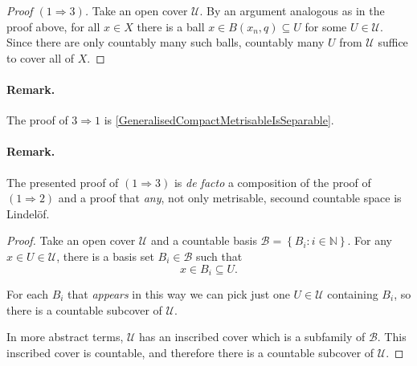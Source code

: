 \begin{proof}[Proof \( (1 \Rightarrow 3) \)]
    Take an open cover \( \mathcal{U} \). By an argument analogous as in the proof above, for all \( x \in X \) there is a ball \(x \in B(x_n, q) \subseteq U \) for some \( U \in \mathcal{U} \). Since there are only countably many such balls, countably many \( U \) from \( \mathcal{U} \) suffice to cover all of \( X \).
\end{proof}

\paragraph{Remark.} The proof of \( 3 \Rightarrow 1 \) is \ref{GeneralisedCompactMetrisableIsSeparable}. 

\paragraph{Remark.} The presented proof of \( (1 \Rightarrow 3) \) is \emph{de facto} a composition of the proof of \( (1 \Rightarrow 2) \) and a proof that \emph{any}, not only metrisable, secound countable space is Lindel\"of.


\begin{proof}
Take an open cover \( \mathcal{U} \) and a countable basis \( \mathcal{B} = \left\{ B_i : i \in \mathbb{N} \right\} \). For any \( x \in U \in \mathcal{U} \), there is a basis set \( B_i \in \mathcal{B}\) such that
\[ 
    x \in B_i \subseteq U.
\]

For each \( B_i \) that \emph{appears} in this way we can pick just one \( U \in \mathcal{U} \) containing \( B_i \), so there is a countable subcover of \( \mathcal{U} \).

In more abstract terms, \( \mathcal{U} \) has an inscribed cover which is a subfamily of \( \mathcal{B} \). This inscribed cover is countable, and therefore there is a countable subcover of \( \mathcal{U} \).
\end{proof}
